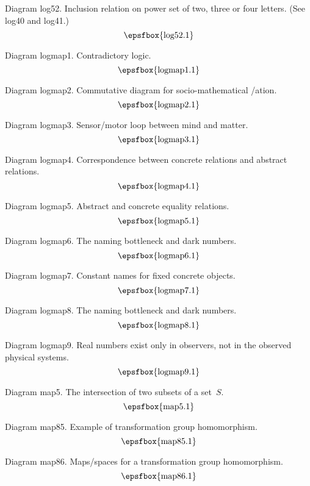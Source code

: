 Diagram log52. Inclusion relation on power set of two, three or four letters.
(See log40 and log41.)
$$
\centerline{\epsfbox{log52.1}}
$$

\secteject
\edef\SECTlogmap{\the\pageno}

Diagram logmap1. Contradictory logic.
$$
\centerline{\epsfbox{logmap1.1}}
$$

Diagram logmap2. Commutative diagram for socio-mathematical \synchronis/ation.
$$
\centerline{\epsfbox{logmap2.1}}
$$

Diagram logmap3. Sensor/motor loop between mind and matter.
$$
\centerline{\epsfbox{logmap3.1}}
$$

Diagram logmap4. Correspondence between concrete relations and abstract
relations.
$$
\centerline{\epsfbox{logmap4.1}}
$$

\filleject

Diagram logmap5. Abstract and concrete equality relations.
$$
\centerline{\epsfbox{logmap5.1}}
$$

Diagram logmap6. The naming bottleneck and dark numbers.
$$
\centerline{\epsfbox{logmap6.1}}
$$

Diagram logmap7. Constant names for fixed concrete objects.
$$
\centerline{\epsfbox{logmap7.1}}
$$

Diagram logmap8. The naming bottleneck and dark numbers.
$$
\centerline{\epsfbox{logmap8.1}}
$$

\filleject

Diagram logmap9. Real numbers exist only in observers, not in the observed
physical systems.
$$
\centerline{\epsfbox{logmap9.1}}
$$

\secteject
\edef\SECTmap{\the\pageno}

Diagram map5. The intersection of two subsets of a set~$S$.
$$
\centerline{\epsfbox{map5.1}}
$$

Diagram map85. Example of transformation group homomorphism.
$$
\centerline{\epsfbox{map85.1}}
$$

Diagram map86. Maps/spaces for a transformation group homomorphism.
$$
\centerline{\epsfbox{map86.1}}
$$


